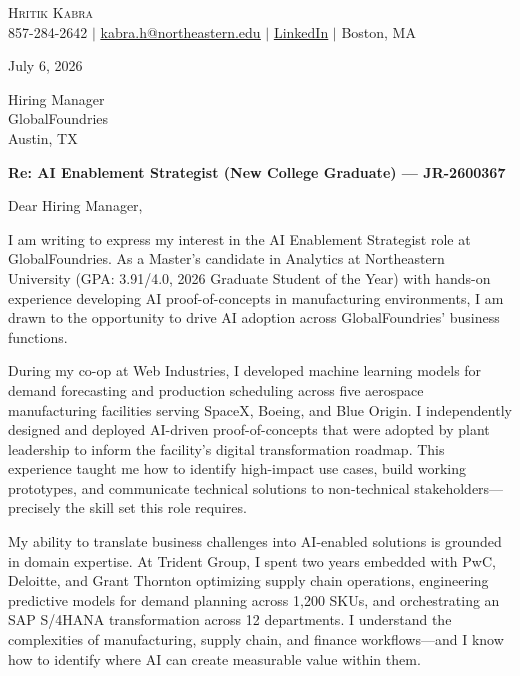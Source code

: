 \documentclass[letterpaper,10pt]{article}
\begin{document}
\begin{center}
    {\LARGE \scshape \color{heading} Hritik Kabra} \\ \vspace{2pt}
    \small 857-284-2642 $|$ \href{mailto:kabra.h@northeastern.edu}{\underline{kabra.h@northeastern.edu}} $|$
    \href{https://www.linkedin.com/in/hritikkabra888}{\underline{LinkedIn}} $|$ Boston, MA
\end{center}

\vspace{8pt}

July 6, 2026

\vspace{4pt}

Hiring Manager \\
GlobalFoundries \\
Austin, TX

\vspace{4pt}

\textbf{Re: AI Enablement Strategist (New College Graduate) --- JR-2600367}

\vspace{4pt}

Dear Hiring Manager,

I am writing to express my interest in the AI Enablement Strategist role at GlobalFoundries. As a Master's candidate in Analytics at Northeastern University (GPA: 3.91/4.0, 2026 Graduate Student of the Year) with hands-on experience developing AI proof-of-concepts in manufacturing environments, I am drawn to the opportunity to drive AI adoption across GlobalFoundries' business functions.

During my co-op at Web Industries, I developed machine learning models for demand forecasting and production scheduling across five aerospace manufacturing facilities serving SpaceX, Boeing, and Blue Origin. I independently designed and deployed AI-driven proof-of-concepts that were adopted by plant leadership to inform the facility's digital transformation roadmap. This experience taught me how to identify high-impact use cases, build working prototypes, and communicate technical solutions to non-technical stakeholders---precisely the skill set this role requires.

My ability to translate business challenges into AI-enabled solutions is grounded in domain expertise. At Trident Group, I spent two years embedded with PwC, Deloitte, and Grant Thornton optimizing supply chain operations, engineering predictive models for demand planning across 1,200 SKUs, and orchestrating an SAP S/4HANA transformation across 12 departments. I understand the complexities of manufacturing, supply chain, and finance workflows---and I know how to identify where AI can create measurable value within them.
\end{document}
